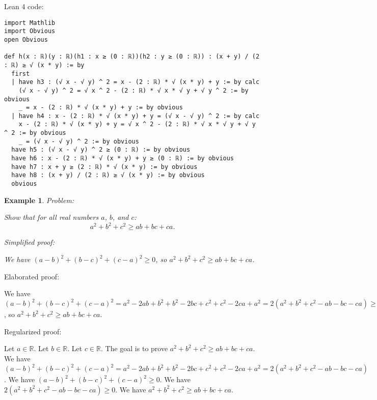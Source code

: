 \documentclass{article}
\newtheorem{example}{Example}
\begin{document}
Lean 4 code:
\begin{tcolorbox}[colback=white!10, width=\linewidth]
\begin{lstlisting}[language=Lean4]
import Mathlib
import Obvious
open Obvious

def h(x : ℝ)(y : ℝ)(h1 : x ≥ (0 : ℝ))(h2 : y ≥ (0 : ℝ)) : (x + y) / (2 : ℝ) ≥ √ (x * y) := by
  first
  | have h3 : (√ x - √ y) ^ 2 = x - (2 : ℝ) * √ (x * y) + y := by calc
    (√ x - √ y) ^ 2 = √ x ^ 2 - (2 : ℝ) * √ x * √ y + √ y ^ 2 := by obvious
    _ = x - (2 : ℝ) * √ (x * y) + y := by obvious
  | have h4 : x - (2 : ℝ) * √ (x * y) + y = (√ x - √ y) ^ 2 := by calc
    x - (2 : ℝ) * √ (x * y) + y = √ x ^ 2 - (2 : ℝ) * √ x * √ y + √ y ^ 2 := by obvious
    _ = (√ x - √ y) ^ 2 := by obvious
  have h5 : (√ x - √ y) ^ 2 ≥ (0 : ℝ) := by obvious
  have h6 : x - (2 : ℝ) * √ (x * y) + y ≥ (0 : ℝ) := by obvious
  have h7 : x + y ≥ (2 : ℝ) * √ (x * y) := by obvious
  have h8 : (x + y) / (2 : ℝ) ≥ √ (x * y) := by obvious
  obvious

\end{lstlisting}
\end{tcolorbox}


\begin{example}
Problem:
\begin{tcolorbox}[colback=yellow!10, width=\linewidth]
Show that for all real numbers $a$, $b$, and $c$:
    $$a^2 + b^2 + c^2 \geq ab + bc + ca.$$
\end{tcolorbox}

Simplified proof:
\begin{tcolorbox}[colback=blue!10, width=\linewidth]
We have $(a-b)^2+(b-c)^2+(c-a)^2 \ge 0$, so $a^2+b^2+c^2 \ge ab+bc+ca$.
\end{tcolorbox}
\end{example}

Elaborated proof:
\begin{tcolorbox}[colback=green!10, width=\linewidth]
We have $(a-b)^2+(b-c)^2+(c-a)^2 = a^2 - 2ab + b^2 + b^2 - 2bc + c^2 + c^2 - 2ca + a^2 = 2(a^2+b^2+c^2 - ab - bc - ca) \ge 0$, so $a^2+b^2+c^2 \ge ab+bc+ca$.
\end{tcolorbox}

Regularized proof:
\begin{tcolorbox}[colback=red!10, width=\linewidth]
Let $a\in\mathbb{R}$. Let $b\in\mathbb{R}$. Let $c\in\mathbb{R}$.
The goal is to prove $a^2+b^2+c^2 \ge ab+bc+ca$.
We have ${{(a-b)}}^2+{{(b-c)}}^2+{{(c-a)}}^2 = a^2 - 2ab + b^2 + b^2 - 2bc + c^2 + c^2 - 2ca + a^2 = 2(a^2+b^2+c^2 - ab - bc - ca)$.
We have ${{(a-b)}}^2+{{(b-c)}}^2+{{(c-a)}}^2 \ge 0$.
We have $2(a^2+b^2+c^2 - ab - bc - ca) \ge 0$.
We have $a^2+b^2+c^2 \ge ab+bc+ca$.
\end{tcolorbox}
\end{document}
